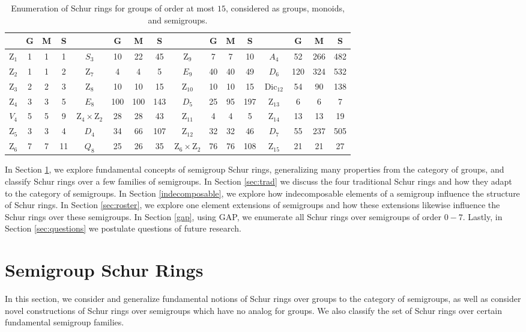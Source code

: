 \documentclass{article}
\theoremstyle{plain}
\theoremstyle{definition}
\newcommand{\z}{\mathrm{Z}}
\begin{document}
\begin{table}[!ht]
\begin{center}
\begin{tabular}{cccc|cccc|cccc|cccc}
 & G & M & S &  & G & M & S &  & G & M & S & & G & M & S\\
\hline
$\z_1$ & 1 & 1 & 1  & $S_3$ & 10 & 22 & 45    & $\z_9$ & 7 & 7 & 10 & $A_4$ & 52 & 266 & 482\\
$\z_2$ & 1 & 1 & 2  & $\z_7$ & 4 & 4 & 5      & $E_9$ & 40 & 40 & 49 & $D_6$ & 120 & 324 & 532\\
$\z_3$ & 2 & 2 & 3  & $\z_8$ & 10 & 10 & 15   & $\z_{10}$ & 10 & 10 & 15 & $\text{Dic}_{12}$ & 54 & 90 & 138\\
$\z_4$ & 3 & 3 & 5  & $E_8$ & 100 & 100 & 143 & $D_5$ & 25 & 95 & 197 & $\z_{13}$ & 6 & 6 & 7\\
$V_4$ & 5 & 5 & 9 & $\z_4\times \z_2$ & 28 & 28 & 43 & $\z_{11}$ & 4 & 4 & 5 & $\z_{14}$ & 13 & 13 & 19\\
$\z_5$ & 3 & 3 & 4  & $D_4$ & 34 & 66 & 107   & $\z_{12}$ & 32 & 32 & 46 & $D_7$ & 55 & 237 & 505\\
$\z_6$ & 7 & 7 & 11 & $Q_8$ & 25 & 26 & 35    & $\z_6\times\z_2$ & 76 & 76 & 108 & $\z_{15}$ & 21 & 21 & 27
\end{tabular}
\caption{Enumeration of Schur rings for groups of order at most $15$, considered as groups, monoids, and semigroups.}\label{tab:groupsemigroup}
\end{center}
\end{table}

In Section \ref{Schurring}, we explore fundamental concepts of semigroup Schur rings, generalizing many properties from the category of groups, and classify Schur rings over a few families of semigroups. In Section \ref{sec:trad} we discuss the four traditional Schur rings and how they adapt to the category of semigroups. In Section \ref{indecomposable}, we explore how indecomposable elements of a semigroup influence the structure of Schur rings. In Section \ref{sec:roster}, we explore one element extensions of semigroups and how these extensions likewise influence the Schur rings over these semigroups. In Section \ref{gap}, using GAP, we enumerate all Schur rings over semigroups of order $0-7$. Lastly, in Section \ref{sec:questions} we postulate questions of future research.

\section{Semigroup Schur Rings}\label{Schurring}
In this section, we consider and generalize fundamental notions of Schur rings over groups to the category of semigroups, as well as consider novel constructions of Schur rings over semigroups which have no analog for groups. We also classify the set of Schur rings over certain fundamental semigroup families. 
\end{document}
